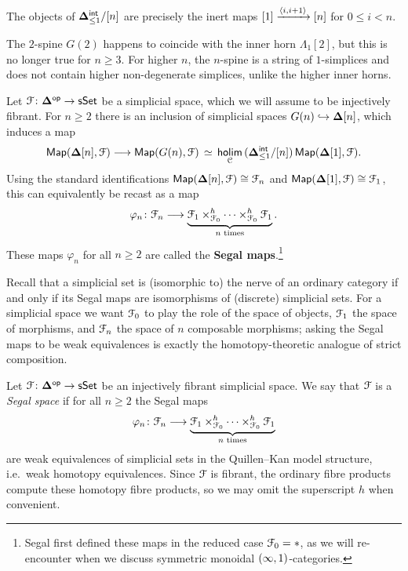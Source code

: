 \begin{remark}
    The objects of $\mathbf\Delta^{\sf int}_{\leq 1}/[n]$ are precisely the inert
    maps $[1] \xrightarrow{\langle i,i+1\rangle} [n]$ for $0\leq i<n$.
\end{remark}

\begin{observation}
    The $2$-spine $G(2)$ happens to coincide with the inner horn
    $\Lambda_{1}[2]$, but this is no longer true for $n\geq 3$. For higher $n$,
    the $n$-spine is a string of $1$-simplices and does not contain higher
    non-degenerate simplices, unlike the higher inner horns.
\end{observation}

Let $\mathcal F\colon \mathbf\Delta^{\mathsf{op}} \to \operatorname{\sf sSet}$ be a simplicial space, which we will
assume to be injectively fibrant. For $n\geq 2$ there is an inclusion of
simplicial spaces $G(n) \hookrightarrow \mathbf\Delta[n]$, which induces a map
\begin{equation}
    \Map(\bDelta[n], \cF) \longra \Map(G(n), \cF)
      \,\simeq\,
      \hoLimit{(\bDelta^{\sf int}_{\leq 1}/[n])}
      \Map(\bDelta[1], \cF).
\end{equation}
Using the standard identifications $\operatorname{{\sf Map}}(\mathbf\Delta[n],\mathcal F)\cong\mathcal F_n$ and
$\operatorname{{\sf Map}}(\mathbf\Delta[1],\mathcal F)\cong\mathcal F_1$, this can equivalently be recast as a map
\begin{equation}
    \varphi_{n} \colon
    \mathcal F_{n} \longrightarrow
    \underbrace{\mathcal F_1 \times_{\mathcal F_{0}}^{h} \cdots
      \times_{\mathcal F_{0}}^{h} \mathcal F_{1}}_{n \text{ times}}.
\end{equation}
These maps $\varphi_n$ for all $n\geq 2$ are called the \textbf{Segal maps}.\footnote{Segal first defined
these maps in the reduced case $\mathcal F_{0} = *$, as we will re-encounter when we
discuss symmetric monoidal $(\operatorname{\infty},1)$-categories.}

Recall that a simplicial set is (isomorphic to) the nerve of an ordinary
category if and only if its Segal maps are isomorphisms of (discrete) simplicial
sets. For a simplicial space we want $\mathcal F_0$ to play the role of the space of
objects, $\mathcal F_1$ the space of morphisms, and $\mathcal F_n$ the space of $n$ composable
morphisms; asking the Segal maps to be weak equivalences is exactly the
homotopy-theoretic analogue of strict composition.

\begin{definition}\label{ch2:: def: segal space}
    Let $\mathcal F \colon \mathbf\Delta^{\mathsf{op}} \to \operatorname{\sf sSet}$ be an injectively fibrant simplicial
    space. We say that $\mathcal F$ is a \emph{Segal space} if for all $n\geq 2$ the
    Segal maps
    \begin{equation}
        \varphi_{n} \colon
        \mathcal F_{n} \longrightarrow
        \underbrace{\mathcal F_1 \times_{\mathcal F_{0}}^{h} \cdots
          \times_{\mathcal F_{0}}^{h} \mathcal F_{1}}_{n \text{ times}}
    \end{equation}
    are weak equivalences of simplicial sets in the Quillen--Kan model
    structure, i.e.\ weak homotopy equivalences. Since $\mathcal F$ is fibrant, the
    ordinary fibre products compute these homotopy fibre products, so we may
    omit the superscript $h$ when convenient.
\end{definition}


